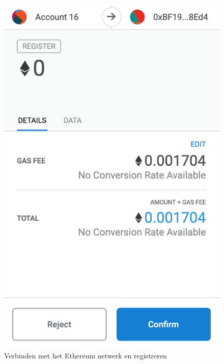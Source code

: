 \begin{figure}
		\includegraphics[width=\linewidth/3]{img/screen_metamask3.png}
		\caption{Verbinden met het Ethereum netwerk en registreren}
		\label{fig:screen_login2}
	\end{figure}
